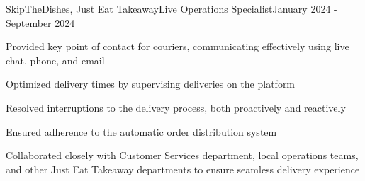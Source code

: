 \begin{resume_employer}{SkipTheDishes, Just Eat Takeaway}{Live Operations Specialist}{}{January 2024 - September 2024}
    \item Provided key point of contact for couriers, communicating effectively using live chat, phone, and email
    \item Optimized delivery times by supervising deliveries on the platform
    \item Resolved interruptions to the delivery process, both proactively and reactively
    \item Ensured adherence to the automatic order distribution system
    \item Collaborated closely with Customer Services department, local operations teams, and other Just Eat Takeaway departments to ensure seamless delivery experience
\end{resume_employer}

